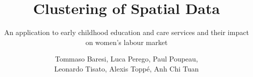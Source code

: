 \documentclass[12pt,aspectratio=169]{beamer}
\title{Clustering of Spatial Data}
\subtitle{An application to early childhood education and care
services and their impact on women’s labour market}
\author{
  Tommaso Baresi, 
  Luca Perego, 
  Paul Poupeau, \\
  Leonardo Tisato,
  Alexis Toppé,
  Anh Chi Tuan}
\institute{February 19\textsuperscript{\tiny{th}}, 2026 }
\begin{document}
\aurigatitleframe

\newcommand{\iid}{\stackrel{\tiny{iid}}{\sim}}
\newcommand{\ind}{\stackrel{\tiny{ind}}{\sim}}




















\end{document}
